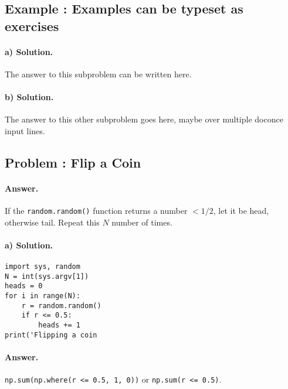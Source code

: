 \documentclass[
oneside,                 
final,                   
10pt]{article}
\begin{document}
\newcommand{\exercisesection}[1]{\subsection*{#1}}




\exercisesection{Example \thedoconceexercisecounter: Examples can be typeset as exercises}
                             

\paragraph{a) Solution.}
The answer to this subproblem can be written here.

\paragraph{b) Solution.}
The answer to this other subproblem goes here,
maybe over multiple doconce input lines.

\exercisesection{Problem \thedoconceexercisecounter: Flip a Coin}
                             


\paragraph{Answer.}
If the \texttt{random.random()} function returns a number $<1/2$, let it be
head, otherwise tail. Repeat this $N$ number of times.

\paragraph{a) Solution.}









\begin{Verbatim}[numbers=none,fontsize=\fontsize{9pt}{9pt},baselinestretch=0.95,xleftmargin=2mm]
import sys, random
N = int(sys.argv[1])
heads = 0
for i in range(N):
    r = random.random()
    if r <= 0.5:
        heads += 1
print('Flipping a coin 

\end{Verbatim}


\paragraph{Answer.}
\texttt{np.sum(np.where(r <= 0.5, 1, 0))} or \texttt{np.sum(r <= 0.5)}.
\end{document}
